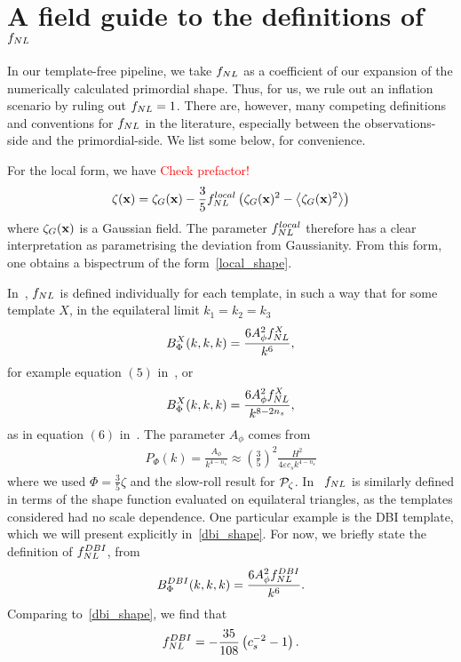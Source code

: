     \section{A field guide to the definitions of $f_{NL}$}
    In our template-free pipeline, we take $f_{NL}$ as a coefficient of our expansion
    of the numerically calculated primordial shape. Thus, for us, we rule out an
    inflation scenario by ruling out $f_{NL}=1$. There are, however, many competing
    definitions and conventions for $f_{NL}$ in the literature, especially between
    the observations-side and the primordial-side. We list some below, for convenience.


    For the local form, we have \textcolor{red}{Check prefactor!}
    \begin{align}\label{fnllocal_quadratic}
        \zeta(\mathbf{x}) = \zeta_G(\mathbf{x}) - \frac{3}{5}f^{local}_{NL}\left(\zeta_G(\mathbf{x})^2-\left<\zeta_G(\mathbf{x})^2\right>\right)
    \end{align}
    where $\zeta_G(\mathbf{x})$ is a Gaussian field. The parameter $f^{local}_{NL}$ therefore has a clear
    interpretation as parametrising the deviation from Gaussianity. From this form,
    one obtains a bispectrum of the form~\eqref{local_shape}.


    In~\cite{Planck_NG_2013}, $f_{NL}$ is defined individually for each template, in such a way
    that for some template $X$, in the equilateral limit $k_1=k_2=k_3$
    \begin{align}\label{planck_fnl_defn}
        B^X_\Phi(k,k,k) = \frac{6A_\phi^2f_{NL}^X}{k^6},
    \end{align}
    for example equation $(5)$ in~\cite{Planck_NG_2013},
    or
    \begin{align}\label{planck_fnl_defn_ns}
        B^X_\Phi(k,k,k) = \frac{6A_\phi^2f_{NL}^X}{k^{8-2n_s}},
    \end{align}
    as in equation $(6)$ in~\cite{Planck_NG_2013}.
    The parameter $A_\phi$ comes from
    \begin{align}
        P_\Phi(k) = \frac{A_\phi}{k^{4-n_s}}\approx\left(\frac{3}{5}\right)^2\frac{H^2}{4\varepsilon c_sk^{4-n_s}}
    \end{align}
    where we used $\Phi=\frac{3}{5}\zeta$ and the slow-roll result for $\mathcal{P}_{\mathcal{\zeta}}$.
    In~\cite{seery_ng_0503, chen_ng_0605, dbi_in_the_sky} $f_{NL}$ is similarly defined in terms
    of the shape function evaluated on equilateral triangles,
    as the templates considered had no scale dependence.
    One particular example is the DBI template, which we will present explicitly in~\eqref{dbi_shape}.
    For now, we briefly state the definition of $f_{NL}^{DBI}$, from~\cite{Planck_NG_2013}
    \begin{align}
        B^{DBI}_\Phi(k,k,k) = \frac{6A_\phi^2f_{NL}^{DBI}}{k^{6}}.
    \end{align}
    Comparing to~\eqref{dbi_shape}, we find that
    \begin{align}\label{fnl_dbi_defn}
        f_{NL}^{DBI} = -\frac{35}{108}\left(c_s^{-2}-1\right).
    \end{align}


